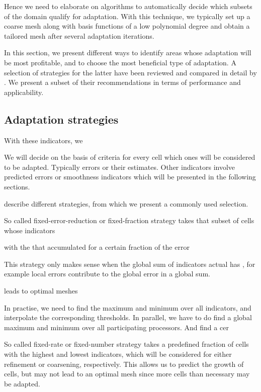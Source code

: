 Hence we need to elaborate on algorithms to automatically decide which subsets of the domain qualify for adaptation. With this technique, we typically set up a coarse mesh along with basis functions of a low polynomial degree and obtain a tailored mesh after several adaptation iterations.

In this section, we present different ways to identify areas whose adaptation will be most profitable, and to choose the most beneficial type of adaptation. A selection of strategies for the latter have been reviewed and compared in detail by \textcite{mitchell2014}. We present a subset of their recommendations in terms of performance and applicability.



\subsection{Adaptation strategies}
\label{ssec:strategy}

With these indicators, we


We will decide on the basis of criteria for every cell which ones will be considered to be adapted. Typically errors or their estimates. Other indicators involve predicted errors or smoothness indicators which will be presented in the following sections.

\textcite[Sec.~5.2]{bangerth2003} describe different strategies, from which we present a commonly used selection.



So called fixed-error-reduction or fixed-fraction strategy takes that subset of cells whose indicators

with the that accumulated for a certain fraction of the error

This strategy only makes sense when the global sum of indicators actual has , for example local errors contribute to the global error in a global sum.

leads to optimal meshes


In practise, we need to find the maximum and minimum over all indicators, and interpolate the corresponding thresholds. In parallel, we have to do find a global maximum and minimum over all participating processors. And find a cer



So called fixed-rate or fixed-number strategy takes a predefined fraction of cells with the highest and lowest indicators, which will be considered for either refinement or coarsening, respectively. This allows us to predict the growth of cells, but may not lead to an optimal mesh since more cells than necessary may be adapted.


